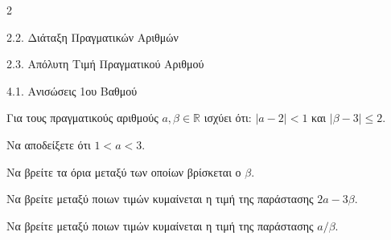 \begin{ylh}{2}
    \item 2.2. Διάταξη Πραγματικών Αριθμών
    \item 2.3. Απόλυτη Τιμή Πραγματικού Αριθμού
    \item 4.1. Ανισώσεις 1ου Βαθμού
\end{ylh}
Για τους πραγματικούς αριθμούς $a, \beta \in \mathbb{R}$ ισχύει ότι: $|a - 2| < 1$ και $|\beta - 3| \le 2$.

\begin{alist}
\item Να αποδείξετε ότι $1 < a < 3$. 
\item Να βρείτε τα όρια μεταξύ των οποίων βρίσκεται ο $\beta$. 
\item Να βρείτε μεταξύ ποιων τιμών κυμαίνεται η τιμή της παράστασης $2a - 3\beta$. 
\item Να βρείτε μεταξύ ποιων τιμών κυμαίνεται η τιμή της παράστασης $a/\beta$. 
\end{alist}

